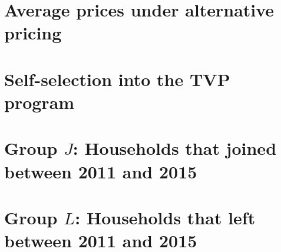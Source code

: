 \documentclass[12pt]{article}
\begin{document}
\begin{appendices}

  \startcontents[sections]

  \clearpage

\renewcommand\thefigure{\thesection.\arabic{figure}}

\section{Average prices under alternative pricing}

  \setcounter{figure}{0}

  \label{appendix:appendix_marschak}

  

\clearpage

\section{Self-selection into the TVP program}

  \setcounter{figure}{0}

  \label{appendix:appendix_selfSelection}

  

\clearpage

\section{Group $J$: Households that joined between 2011 and 2015}

  \setcounter{figure}{0}

  \label{appendix:appendix_groupJ}

  

\clearpage

\clearpage

\section{Group $L$: Households that left between 2011 and 2015}

  \setcounter{figure}{0}

  \label{appendix:appendix_groupL}

  

\clearpage


\end{appendices}
\end{document}
